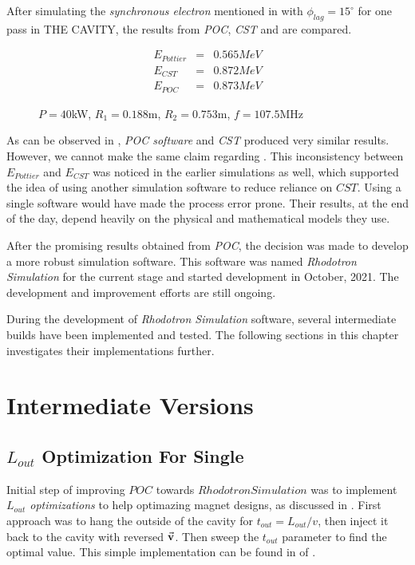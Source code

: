 \documentclass[a4paper,oneside,12pt]{report}
\numberwithin{equation}{chapter}
\begin{document}
After simulating the \textit{synchronous electron} mentioned in  with $\phi_{lag}=15^\circ$ for one pass in THE CAVITY, the results from \textit{POC}, \textit{CST} and  are compared.
\begin{figure}[H]
    \begin{eqnarray}
        E_{Pottier} &=& 0.565 MeV \nonumber\\
        E_{CST} &=& 0.872 MeV  \label{eq:poc_E_results}\\
        E_{POC} &=& 0.873 MeV \nonumber
    \end{eqnarray}
    \caption*{$P=40$kW, $R_1=0.188$m, $R_2=0.753$m, $f=107.5$MHz}
\end{figure}


As can be observed in , \textit{POC software} and \textit{CST} produced very similar results. However, we cannot make the same claim regarding .
This inconsistency between $E_{Pottier}$ and $E_{CST}$ was noticed in the earlier simulations as well, which supported the idea of using another simulation software to reduce reliance on $CST$.
Using a single software would have made the process error prone. Their results, at the end of the day, depend heavily on the physical and mathematical models they use.

After the promising results obtained from \textit{POC}, the decision was made to develop a more robust simulation software. This software was named \textit{Rhodotron Simulation} for the current stage and started development in October, 2021.
The development and improvement efforts are still ongoing. 

During the development of \textit{Rhodotron Simulation} software, several intermediate builds have been implemented and tested. The following sections in this chapter investigates their implementations further.



\newpage


\section{Intermediate Versions}

\subsection{$L_{out}$ Optimization For Single \e} \label{sec:lout_sweep}
Initial step of improving $POC$ towards $Rhodotron Simulation$ was to implement \textit{$L_{out}$ optimizations} to help optimazing magnet designs, as discussed in .
First approach was to hang the \e outside of the cavity for $t_{out} = L_{out}/v$, then inject it back to the cavity with reversed $\vec{\textbf{v}}$. Then sweep the $t_{out}$ parameter to find the optimal value.
This simple implementation can be found in  of .
\end{document}
